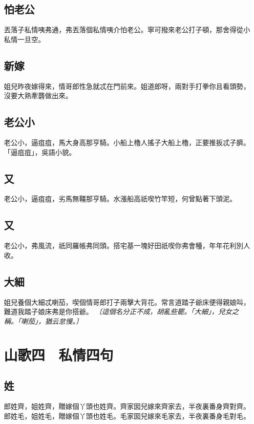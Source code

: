 \subsection*{怕老公}

丟落子私情咦弗通，弗丟落個私情咦介怕老公。寧可撥來老公打子頓，那舍得從小私情一旦空。

\subsection*{新嫁}

姐兒昨夜嫁得來，情哥郎性急就忒在門前來。姐道郎呀，兩對手打拳你且看頭勢，沒要大熟牽礱做出來。

\subsection*{老公小}

老公小，逼疽疽，馬大身高那亨騎。小船上櫓人搖子大船上櫓，正要推扳忒子臍。「逼疽疽」，吳語小貌。

\subsection*{又}

老公小，逼疽疽，劣馬無韁那亨騎。水漲船高祇喫竹竿短，何曾點著下頭泥。

\subsection*{又}

老公小，弗風流，祇同羅帳弗同頭。搭宅基一塊好田祇喫你弗會種，年年花利別人收。

\subsection*{大細}

姐兒養個大細忒喇茄，喫個情哥郎打子兩擊大背花。常言道踏子爺床便得親娘叫，難道我踏子娘床弗是你搭爺。
\textit{〔這個名分正不成，胡亂些罷。「大細」，兒女之稱。「喇茄」，猶云怠慢。〕}


\section*{山歌四　私情四句}
\subsection*{姓}

郎姓齊，姐姓齊，贈嫁個丫頭也姓齊。齊家囡兒嫁來齊家去，半夜裏番身齊對齊。郎姓毛，姐姓毛，贈嫁個丫頭也姓毛。毛家囡兒嫁來毛家去，半夜裏番身毛對毛。

